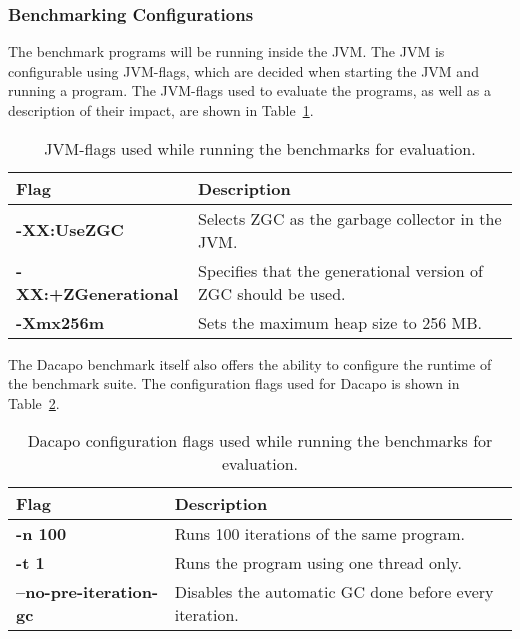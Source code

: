 \subsubsection{Benchmarking Configurations}
The benchmark programs will be running inside the JVM. The JVM is configurable using JVM-flags, which are decided when starting the JVM and running a program. The JVM-flags used to evaluate the programs, as well as a description of their impact, are shown in Table~\ref{table:jvmflags}.

\begin{table}[H]
  \centering
  \begin{tabular}{|l|p{10cm}|}
    \hline
    \textbf{Flag} & \textbf{Description} \\ \hline
    \textbf{-XX:UseZGC} & Selects ZGC as the garbage collector in the JVM. \\ \hline
    \textbf{-XX:+ZGenerational} & Specifies that the generational version of ZGC should be used. \\ \hline
    \textbf{-Xmx256m} & Sets the maximum heap size to 256 MB. \\ \hline
  \end{tabular}
  \caption{JVM-flags used while running the benchmarks for evaluation.}
  \label{table:jvmflags}
\end{table}

The Dacapo benchmark itself also offers the ability to configure the runtime of the benchmark suite. The configuration flags used for Dacapo is shown in Table~\ref{table:dacapoflags}.


\begin{table}[H]
  \centering
  \begin{tabular}{|l|p{10cm}|}
    \hline
    \textbf{Flag} & \textbf{Description} \\ \hline
    \textbf{-n 100} & Runs 100 iterations of the same program. \\ \hline
    \textbf{-t 1} & Runs the program using one thread only. \\ \hline
    \textbf{--no-pre-iteration-gc} & Disables the automatic GC done before every iteration. \\ \hline
  \end{tabular}
  \caption{Dacapo configuration flags used while running the benchmarks for evaluation.}
  \label{table:dacapoflags}
\end{table}

